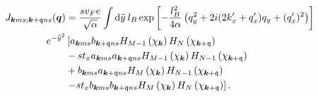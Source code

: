 \begin{equation}
  \begin{split}
    J_{\bm{k}ms; \bm{k}+\mathfrak{q} ns}(\bm{q}) &=
    \frac{s v_F e}{\sqrt{\alpha }} \int \mathrm{d}\tilde{y} \: l_B
    \exp \left[
      -\frac{l_{B}^2}{4 \alpha } \left(q_{y}^2 + 2i (2 k' _x + q' _x) q_{y} + (q'_x)^2 \right)
    \right]
   \\
    e^{-\tilde{y}^2}
   &\left[
    a_{\bm{k}ms}b_{\bm{k} + \mathfrak{q} ns}
    H_{M-1} \left(  \chi_{\bm{k}} \right)
    H_N\left( \chi_{\bm{k} + \mathfrak{q}} \right) \right.\\
    &- s t_{x} a_{\bm{k}ms}a_{\bm{k} + \mathfrak{q} ns}
    H_{M-1} \left( \chi_{\bm{k}} \right)
    H_{N-1}\left( \chi_{\bm{k} + \mathfrak{q}} \right)\\
   & +
    b_{\bm{k}ms} a_{\bm{k} + \mathfrak{q} ns}
    H_M \left( \chi_{\bm{k}} \right)
    H_{N-1} \left( \chi_{\bm{k} + \mathfrak{q}} \right)\\
    &\left. - s t_{x}
    b_{\bm{k}ms} b_{\bm{k} + \mathfrak{q} ns}
    H_M \left( \chi_{\bm{k}} \right)
    H_{N} \left(  \chi_{\bm{k} + \mathfrak{q}}\right)
    \right].
  \end{split}
\end{equation}

